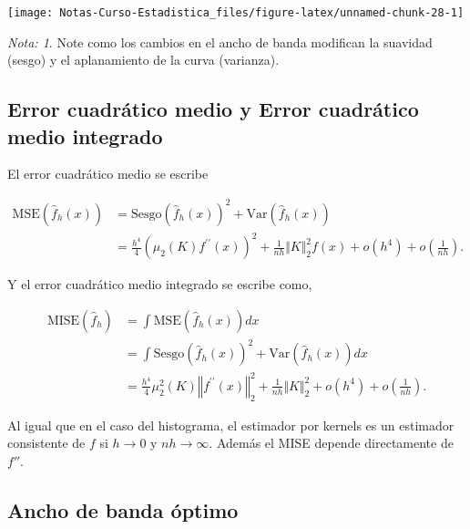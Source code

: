 \documentclass[
  12pt,
]{book}
\theoremstyle{definition}
\theoremstyle{definition}
\theoremstyle{definition}
\theoremstyle{definition}
\theoremstyle{remark}
\newtheorem*{remark}{Nota: }
\begin{document}
\begin{center}\texttt{[image: Notas-Curso-Estadistica\_files/figure-latex/unnamed-chunk-28-1]} \end{center}

\begin{remark}
Note como los cambios en el ancho de banda modifican la suavidad (sesgo) y el aplanamiento de la curva (varianza).
\end{remark}

\hypertarget{error-cuadruxe1tico-medio-y-error-cuadruxe1tico-medio-integrado}{%
\subsection{Error cuadrático medio y Error cuadrático medio integrado}\label{error-cuadruxe1tico-medio-y-error-cuadruxe1tico-medio-integrado}}

El error cuadrático medio se escribe

\begin{align*}
\mathrm{MSE}(\hat{f}_{h}(x))
& = \mathrm{Sesgo}\left(\hat{f}_{h}(x)\right)^{2} + \mathrm{Var}\left(\hat{f}_{h}(x)\right)                                                 \\
& = \frac{h^{4}}{4}\left(\mu_{2}(K)f^{\prime\prime}(x)\right)^{2}+\frac{1}{nh}\Vert K\Vert_{2}^{2}f(x)+o(h^{4})+o\left(\frac{1}{nh}\right).
\end{align*}

Y el error cuadrático medio integrado se escribe como,

\begin{align*}
\mathrm{MISE}\left(\hat{f}_{h}\right) & = \int \mathrm{MSE}\left(\hat{f}_{h}(x)\right)dx                                                                                                        \\
& = \int \mathrm{Sesgo}\left(\hat{f}_{h}(x)\right)^{2} + \mathrm{Var}\left(\hat{f}_{h}(x)\right)dx                                                        \\
& = \frac{h^{4}}{4}\mu_{2}^{2}(K)\left\Vert f^{\prime\prime}(x)\right\Vert_{2}^{2} +\frac{1}{nh}\Vert K\Vert_{2}^{2}+o(h^{4})+o\left(\frac{1}{nh}\right).
\end{align*}

Al igual que en el caso del histograma, el estimador por kernels es un estimador consistente de \(f\) si \(h\rightarrow 0\) y \(nh\rightarrow \infty\). Además el MISE depende directamente de \(f''\).

\hypertarget{ancho-de-banda-uxf3ptimo}{%
\subsection{Ancho de banda óptimo}\label{ancho-de-banda-uxf3ptimo}}
\end{document}
